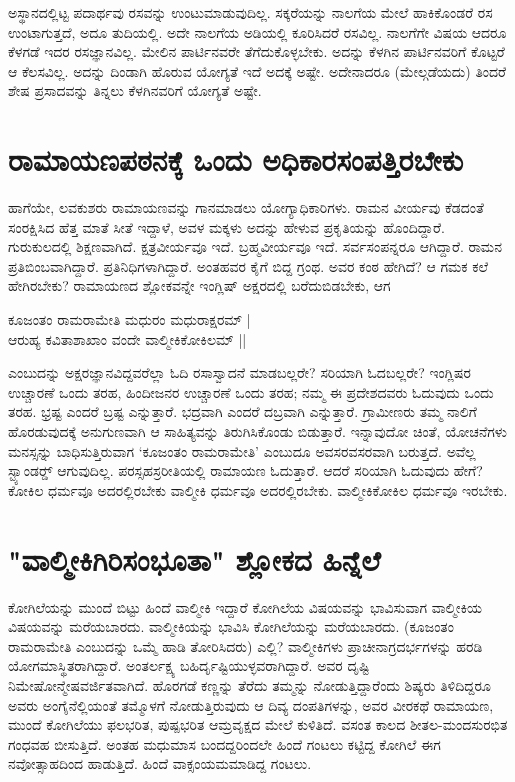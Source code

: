 ಅಸ್ಥಾನದಲ್ಲಿಟ್ಟ ಪದಾರ್ಥವು ರಸವನ್ನು ಉಂಟುಮಾಡುವುದಿಲ್ಲ. ಸಕ್ಕರೆಯನ್ನು ನಾಲಗೆಯ ಮೇಲೆ ಹಾಕಿಕೊಂಡರೆ ರಸ ಉಂಟಾಗುತ್ತದೆ, ಅದೂ ತುದಿಯಲ್ಲಿ. ಅದೇ ನಾಲಗೆಯ ಅಡಿಯಲ್ಲಿ ಕೂರಿಸಿದರೆ ರಸವಿಲ್ಲ. ನಾಲಗೆಗೇ ವಿಷಯ ಆದರೂ ಕೆಳಗಡೆ ಇದರ ರಸಜ್ಞಾನವಿಲ್ಲ. ಮೇಲಿನ ಪಾರ್ಟಿನವರೇ ತೆಗೆದುಕೊಳ್ಳಬೇಕು. ಅದನ್ನು ಕೆಳಗಿನ ಪಾರ್ಟಿನವರಿಗೆ ಕೊಟ್ಟರೆ ಆ ಕೆಲಸವಿಲ್ಲ. ಅದನ್ನು ದಿಂಡಾಗಿ ಹೊರುವ ಯೋಗ್ಯತೆ ಇದೆ ಅದಕ್ಕೆ ಅಷ್ಟೇ. ಅದೇನಾದರೂ (ಮೇಲ್ಗಡೆಯದು) ತಿಂದರೆ ಶೇಷ ಪ್ರಸಾದವನ್ನು ತಿನ್ನಲು ಕೆಳಗಿನವರಿಗೆ ಯೋಗ್ಯತೆ ಅಷ್ಟೇ. 

\section*{ರಾಮಾಯಣಪಠನಕ್ಕೆ ಒಂದು ಅಧಿಕಾರಸಂಪತ್ತಿರಬೇಕು} 

ಹಾಗೆಯೇ, ಲವಕುಶರು ರಾಮಾಯಣವನ್ನು ಗಾನಮಾಡಲು ಯೋಗ್ಯಾಧಿಕಾರಿಗಳು. ರಾಮನ ವೀರ್ಯವು ಕೆಡದಂತೆ ಸಂರಕ್ಷಿಸಿದ ಹೆತ್ತ ಮಾತೆ ಸೀತೆ ಇದ್ದಾಳೆ, ಅವಳ ಮಕ್ಕಳು ಅದನ್ನು ಹೇಳುವ ಪ್ರಕೃತಿಯನ್ನು ಹೊಂದಿದ್ದಾರೆ. ಗುರುಕುಲದಲ್ಲಿ ಶಿಕ್ಷಣವಾಗಿದೆ. ಕ್ಷತ್ರವೀರ್ಯವೂ ಇದೆ. ಬ್ರಹ್ಮವೀರ್ಯವೂ ಇದೆ. ಸರ್ವಸಂಪನ್ನರೂ ಆಗಿದ್ದಾರೆ. ರಾಮನ ಪ್ರತಿಬಿಂಬವಾಗಿದ್ದಾರೆ. ಪ್ರತಿನಿಧಿಗಳಾಗಿದ್ದಾರೆ. ಅಂತಹವರ ಕೈಗೆ ಬಿದ್ದ ಗ್ರಂಥ. ಅವರ ಕಂಠ ಹೇಗಿದೆ? ಆ ಗಮಕ ಕಲೆ ಹೇಗಿರಬೇಕು? ರಾಮಾಯಣದ ಶ್ಲೋಕವನ್ನೇ ಇಂಗ್ಲಿಷ್‍ ಅಕ್ಷರದಲ್ಲಿ ಬರೆದುಬಿಡಬೇಕು, ಆಗ 

\begin{shloka}
ಕೂಜಂತಂ ರಾಮರಾಮೇತಿ ಮಧುರಂ ಮಧುರಾಕ್ಷರಮ್‍ |\label{184}\\ 
ಆರುಹ್ಯ ಕವಿತಾಶಾಖಾಂ ವಂದೇ ವಾಲ್ಮೀಕಿಕೋಕಿಲಮ್‍ || 
\end{shloka} 

ಎಂಬುದನ್ನು ಅಕ್ಷರಜ್ಞಾನವಿದ್ದವರೆಲ್ಲಾ ಓದಿ ರಸಾಸ್ವಾದನೆ ಮಾಡಬಲ್ಲರೇ? ಸರಿಯಾಗಿ ಓದಬಲ್ಲರೇ? ಇಂಗ್ಲಿಷರ ಉಚ್ಚಾರಣೆ ಒಂದು ತರಹ, ಹಿಂದೀಜನರ ಉಚ್ಚಾರಣೆ ಒಂದು ತರಹ; ನಮ್ಮ ಈ ಪ್ರದೇಶದವರು ಓದುವುದು ಒಂದು ತರಹ. ಭ್ರಷ್ಟ ಎಂದರೆ ಬ್ರಷ್ಟ ಎನ್ನುತ್ತಾರೆ. ಭದ್ರವಾಗಿ ಎಂದರೆ ದಬ್ರವಾಗಿ ಎನ್ನುತ್ತಾರೆ. ಗ್ರಾಮೀಣರು ತಮ್ಮ ನಾಲಿಗೆ ಹೊರಡುವುದಕ್ಕೆ ಅನುಗುಣವಾಗಿ ಆ ಸಾಹಿತ್ಯವನ್ನು ತಿರುಗಿಸಿಕೊಂಡು ಬಿಡುತ್ತಾರೆ. ಇನ್ನಾವುದೋ ಚಿಂತೆ, ಯೋಚನೆಗಳು ಮನಸ್ಸನ್ನು ಬಾಧಿಸುತ್ತಿರುವಾಗ `ಕೂಜಂತಂ ರಾಮರಾಮೇತಿ' ಎಂಬುದೂ ಅವಸರವಸರವಾಗಿ ಬರುತ್ತದೆ. ಅವೆಲ್ಲ ಸ್ಟ್ಯಾಂಡರ್ಡ್‍ ಆಗುವುದಿಲ್ಲ. ಪರಸ್ಸಹಸ್ರರೀತಿಯಲ್ಲಿ ರಾಮಾಯಣ ಓದುತ್ತಾರೆ. ಆದರೆ ಸರಿಯಾಗಿ ಓದುವುದು ಹೇಗೆ? ಕೋಕಿಲ ಧರ್ಮವೂ ಅದರಲ್ಲಿರಬೇಕು ವಾಲ್ಮೀಕಿ ಧರ್ಮವೂ ಅದರಲ್ಲಿರಬೇಕು. ವಾಲ್ಮೀಕಿಕೋಕಿಲ ಧರ್ಮವೂ ಇರಬೇಕು. 

\section*{"ವಾಲ್ಮೀಕಿಗಿರಿಸಂಭೂತಾ" ಶ್ಲೋಕದ ಹಿನ್ನೆಲೆ} 

ಕೋಗಿಲೆಯನ್ನು ಮುಂದೆ ಬಿಟ್ಟು ಹಿಂದೆ ವಾಲ್ಮೀಕಿ ಇದ್ದಾರೆ ಕೋಗಿಲೆಯ ವಿಷಯವನ್ನು ಭಾವಿಸುವಾಗ ವಾಲ್ಮೀಕಿಯ ವಿಷಯವನ್ನು ಮರೆಯಬಾರದು. ವಾಲ್ಮೀಕಿಯನ್ನು ಭಾವಿಸಿ ಕೋಗಿಲೆಯನ್ನು ಮರೆಯಬಾರದು. (ಕೂಜಂತಂ ರಾಮರಾಮೇತಿ ಎಂಬುದನ್ನು ಒಮ್ಮೆ ಹಾಡಿ ತೋರಿಸಿದರು) ಎಲ್ಲಿ? ವಾಲ್ಮೀಕಿಗಳು ಪ್ರಾಚೀನಾಗ್ರದರ್ಭಗಳನ್ನು ಹರಡಿ ಯೋಗಮಾಸ್ಥಿತರಾಗಿದ್ದಾರೆ. ಅಂತರ್ಲಕ್ಷ್ಯ ಬಹಿರ್ದೃಷ್ಟಿಯುಳ್ಳವರಾಗಿದ್ದಾರೆ. ಅವರ ದೃಷ್ಟಿ ನಿಮೇಷೋನ್ಮೇಷವರ್ಜಿತವಾಗಿದೆ. ಹೊರಗಡೆ ಕಣ್ಣನ್ನು ತೆರೆದು ತಮ್ಮನ್ನು ನೋಡುತ್ತಿದ್ದಾರೆಂದು ಶಿಷ್ಯರು ತಿಳಿದಿದ್ದರೂ ಅವರು ಅಂಗೈನೆಲ್ಲಿಯಂತೆ ತಮ್ಮೊಳಗೆ ನೋಡುತ್ತಿರುವುದು ಆ ದಿವ್ಯ ದಂಪತಿಗಳನ್ನು, ಅವರ ವೀರಕಥೆ ರಾಮಾಯಣ, ಮುಂದೆ ಕೋಗಿಲೆಯು ಫಲಭರಿತ, ಪುಷ್ಪಭರಿತ ಆಮ್ರವೃಕ್ಷದ ಮೇಲೆ ಕುಳಿತಿದೆ. ವಸಂತ ಕಾಲದ ಶೀತಲ-ಮಂದಸುರಭಿತ ಗಂಧವಹ ಬೀಸುತ್ತಿದೆ. ಅಂತಹ ಮಧುಮಾಸ ಬಂದದ್ದರಿಂದಲೇ ಹಿಂದೆ ಗಂಟಲು ಕಟ್ಟಿದ್ದ ಕೋಗಿಲೆ ಈಗ ನವೋತ್ಸಾಹದಿಂದ ಹಾಡುತ್ತಿದೆ. ಹಿಂದೆ ವಾಕ್ಸಂಯಮಮಾಡಿದ್ದ ಗಂಟಲು. 

